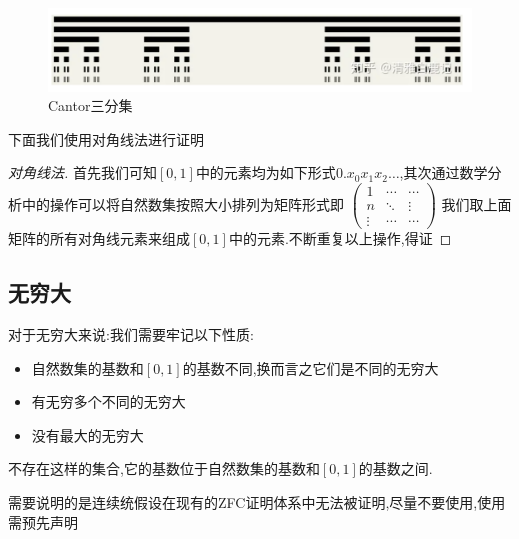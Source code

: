 \begin{figure}[h]
    \centering
    \includegraphics[width=0.5\linewidth]{figures/image_1.png}
    \caption{Cantor三分集}
    \label{fig:enter-label_1}
\end{figure}
下面我们使用对角线法进行证明
\begin{proof}[对角线法]
    首先我们可知\([0,1]\)中的元素均为如下形式\(0.x_0x_1x_2\dots\),其次通过数学分析中的操作可以将自然数集按照大小排列为矩阵形式即
\(   \begin{pmatrix}  
  1& \cdots & \cdots \\  
  n & \ddots & \vdots \\  
  \vdots & \cdots & \cdots  
\end{pmatrix} \) 
我们取上面矩阵的所有对角线元素来组成\([0,1]\)中的元素.不断重复以上操作,得证
\end{proof}
\subsection{无穷大}
对于无穷大来说:我们需要牢记以下性质:\\
\begin{itemize}
    \item 自然数集的基数和\([0,1]\)的基数不同,换而言之它们是不同的无穷大 \\
    \item 有无穷多个不同的无穷大 \\
    \item 没有最大的无穷大
\end{itemize}
\begin{Proposition}[连续统假设]
    不存在这样的集合,它的基数位于自然数集的基数和\([0,1]\)的基数之间.
\end{Proposition}
需要说明的是连续统假设在现有的ZFC证明体系中无法被证明,尽量不要使用,使用需预先声明
